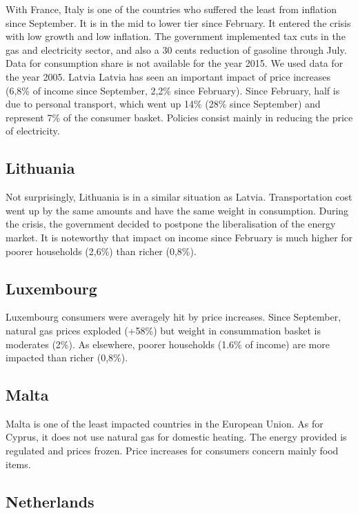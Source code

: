 \documentclass[
  9pt,
  a4paper,
  numbers=noendperiod,
  DIV=12]{scrartcl}
\begin{document}
With France, Italy is one of the countries who suffered the least from
inflation since September. It is in the mid to lower tier since
February. It entered the crisis with low growth and low inflation. The
government implemented tax cuts in the gas and electricity sector, and
also a 30 cents reduction of gasoline through July. Data for consumption
share is not available for the year 2015. We used data for the year
2005. Latvia Latvia has seen an important impact of price increases
(6,8\% of income since September, 2,2\% since February). Since February,
half is due to personal transport, which went up 14\% (28\% since
September) and represent 7\% of the consumer basket. Policies consist
mainly in reducing the price of electricity.

\hypertarget{lithuania}{%
\subsection{Lithuania}\label{lithuania}}

Not surprisingly, Lithuania is in a similar situation as Latvia.
Transportation cost went up by the same amounts and have the same weight
in consumption. During the crisis, the government decided to postpone
the liberalisation of the energy market. It is noteworthy that impact on
income since February is much higher for poorer households (2,6\%) than
richer (0,8\%).

\hypertarget{luxembourg}{%
\subsection{Luxembourg}\label{luxembourg}}

Luxembourg consumers were averagely hit by price increases. Since
September, natural gas prices exploded (+58\%) but weight in
consummation basket is moderates (2\%). As elsewhere, poorer households
(1.6\% of income) are more impacted than richer (0,8\%).

\hypertarget{malta}{%
\subsection{Malta}\label{malta}}

Malta is one of the least impacted countries in the European Union. As
for Cyprus, it does not use natural gas for domestic heating. The energy
provided is regulated and prices frozen. Price increases for consumers
concern mainly food items.

\hypertarget{netherlands}{%
\subsection{Netherlands}\label{netherlands}}
\end{document}
